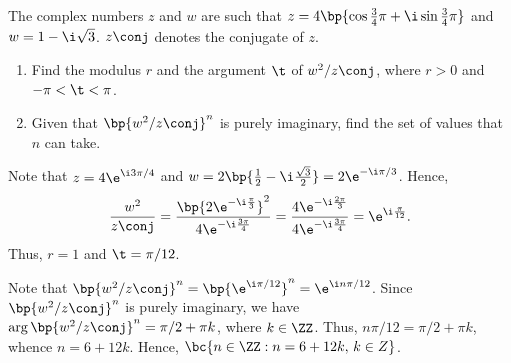 \begin{problem}
    The complex numbers $z$ and $w$ are such that $z = 4\bp{\cos \frac34\pi + \i\sin \frac34 \pi}$ and $w = 1 - \i\sqrt3$. $z\conj$ denotes the conjugate of $z$.

    \begin{enumerate}
        \item Find the modulus $r$ and the argument $\t$ of $w^2 / z\conj$, where $r > 0$ and $-\pi < \t < \pi$.
        \item Given that $\bp{w^2 / z\conj}^n$ is purely imaginary, find the set of values that $n$ can take.
    \end{enumerate}
\end{problem}
\begin{solution}
    \begin{ppart}
        Note that $z = 4\e^{\i3\pi/4}$ and $w = 2\bp{\frac12 - \i\frac{\sqrt3}2} = 2\e^{-\i\pi/3}$. Hence, \[\frac{w^2}{z\conj} = \frac{\bp{2\e^{-\i\frac{\pi}3}}^2}{4\e^{-\i\frac{3\pi}4}} = \frac{4\e^{-\i\frac{2\pi}3}}{4\e^{-\i\frac{3\pi}4}} = \e^{\i\frac{\pi}{12}}.\] Thus, $r = 1$ and $\t = \pi/12$.
    \end{ppart}
    \begin{ppart}
        Note that $\bp{w^2 / z\conj}^n = \bp{\e^{\i\pi/12}}^n = \e^{\i n\pi/12}$. Since $\bp{w^2 / z\conj}^n$ is purely imaginary, we have $\arg \bp{w^2 / z\conj}^n = \pi/2+ \pi k$, where $k \in \ZZ$. Thus, $n\pi/12 = \pi/2 + \pi k$, whence $n =  6 + 12k$. Hence, $\bc{n \in \ZZ: n = 6 + 12k, \, k \in Z}$.
    \end{ppart}
\end{solution}


